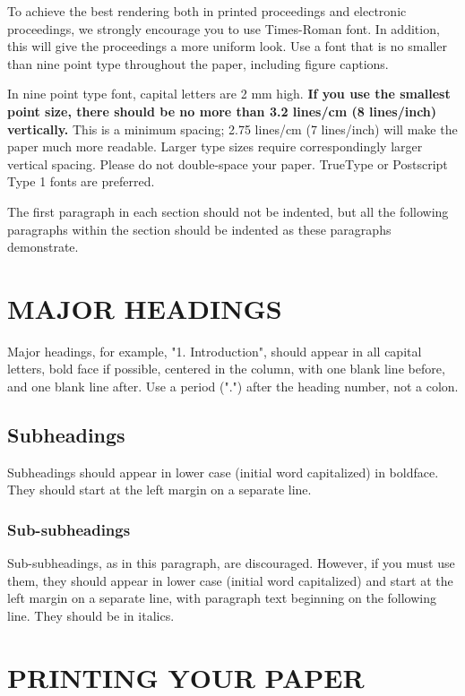 \documentclass{article}
\begin{document}
To achieve the best rendering both in printed proceedings and electronic proceedings, we
strongly encourage you to use Times-Roman font.  In addition, this will give
the proceedings a more uniform look.  Use a font that is no smaller than nine
point type throughout the paper, including figure captions.

In nine point type font, capital letters are 2 mm high.  {\bf If you use the
smallest point size, there should be no more than 3.2 lines/cm (8 lines/inch)
vertically.}  This is a minimum spacing; 2.75 lines/cm (7 lines/inch) will make
the paper much more readable.  Larger type sizes require correspondingly larger
vertical spacing.  Please do not double-space your paper.  TrueType or
Postscript Type 1 fonts are preferred.

The first paragraph in each section should not be indented, but all the
following paragraphs within the section should be indented as these paragraphs
demonstrate.

\section{MAJOR HEADINGS}
\label{sec:majhead}

Major headings, for example, "1. Introduction", should appear in all capital
letters, bold face if possible, centered in the column, with one blank line
before, and one blank line after. Use a period (".") after the heading number,
not a colon.

\subsection{Subheadings}
\label{ssec:subhead}

Subheadings should appear in lower case (initial word capitalized) in
boldface.  They should start at the left margin on a separate line.
 
\subsubsection{Sub-subheadings}
\label{sssec:subsubhead}

Sub-subheadings, as in this paragraph, are discouraged. However, if you
must use them, they should appear in lower case (initial word
capitalized) and start at the left margin on a separate line, with paragraph
text beginning on the following line.  They should be in italics.

\section{PRINTING YOUR PAPER}
\label{sec:print}
\end{document}

